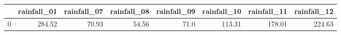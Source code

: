 \begin{tabular}{lrrrrrrr}
\toprule
{} &  rainfall\_01 &  rainfall\_07 &  rainfall\_08 &  rainfall\_09 &  rainfall\_10 &  rainfall\_11 &  rainfall\_12 \\
\midrule
0 &       284.52 &        70.93 &        54.56 &         71.0 &       113.31 &       178.01 &       224.63 \\
\bottomrule
\end{tabular}
